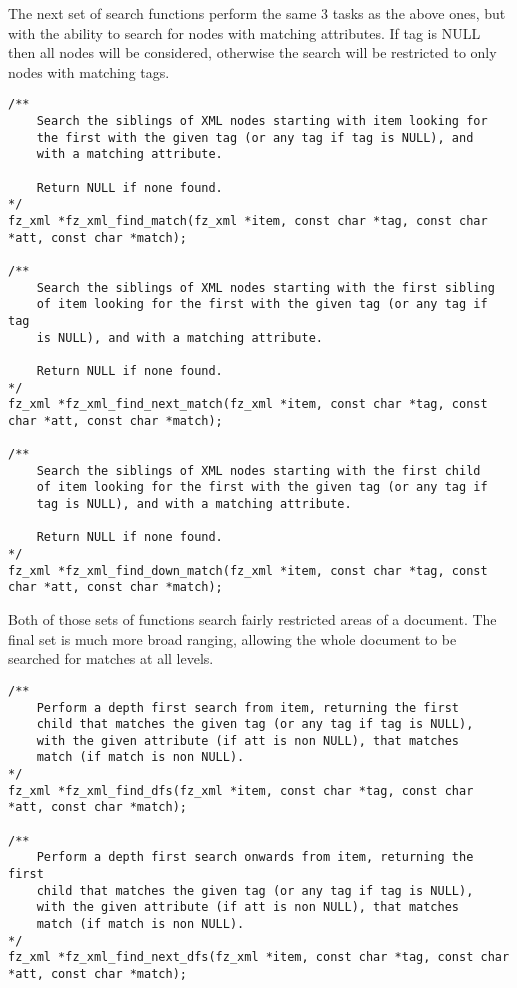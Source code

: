 \documentclass[oneside]{book}
\begin{document}
The next set of search functions perform the same 3 tasks as the above ones, but with the ability to search for nodes with matching attributes. If tag is NULL then all nodes will be considered, otherwise the search will be restricted to only nodes with matching tags.

\begin{lstlisting}
/**
	Search the siblings of XML nodes starting with item looking for
	the first with the given tag (or any tag if tag is NULL), and
	with a matching attribute.

	Return NULL if none found.
*/
fz_xml *fz_xml_find_match(fz_xml *item, const char *tag, const char *att, const char *match);

/**
	Search the siblings of XML nodes starting with the first sibling
	of item looking for the first with the given tag (or any tag if tag
	is NULL), and with a matching attribute.

	Return NULL if none found.
*/
fz_xml *fz_xml_find_next_match(fz_xml *item, const char *tag, const char *att, const char *match);

/**
	Search the siblings of XML nodes starting with the first child
	of item looking for the first with the given tag (or any tag if
	tag is NULL), and with a matching attribute.

	Return NULL if none found.
*/
fz_xml *fz_xml_find_down_match(fz_xml *item, const char *tag, const char *att, const char *match);
\end{lstlisting}

Both of those sets of functions search fairly restricted areas of a document. The final set is much more broad ranging, allowing the whole document to be searched for matches at all levels.

\begin{lstlisting}
/**
	Perform a depth first search from item, returning the first
	child that matches the given tag (or any tag if tag is NULL),
	with the given attribute (if att is non NULL), that matches
	match (if match is non NULL).
*/
fz_xml *fz_xml_find_dfs(fz_xml *item, const char *tag, const char *att, const char *match);

/**
	Perform a depth first search onwards from item, returning the first
	child that matches the given tag (or any tag if tag is NULL),
	with the given attribute (if att is non NULL), that matches
	match (if match is non NULL).
*/
fz_xml *fz_xml_find_next_dfs(fz_xml *item, const char *tag, const char *att, const char *match);
\end{lstlisting}
\end{document}
